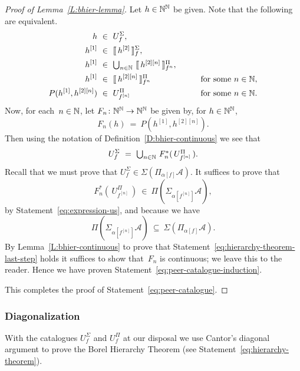 \begin{proof}[Proof of Lemma~\ref{L:bhier-lemma}]
Let $h\in\mathbb{N}^{\mathbb{N}}$ be given.
Note that the following are equivalent.
\begin{alignat*}{3}
h \ &\in\  U^\Sigma_f, \\
h^{[1]} \ &\in\ \decode{\,h^{[2]}\,}^\Sigma_f, \\
h^{[1]} \ &\in\ 
\textstyle{\bigcup_{n\in\N}}\ 
        \decode{\,h^{[2][n]}\,}^\Pi_{f^{n}}, \qquad\\
 h^{[1]} \ &\in\ 
        \decode{\,h^{[2][n]}\,}^\Pi_{f^{n}} 
\qquad&\text{for some $n\in\N$},\\
 P(h^{[1]},h^{[2][n]}) \ &\in\ 
        U^{\Pi}_{f^{[n]}} 
\qquad&\text{for some $n\in\N$}.
\end{alignat*}
Now,
for each~$n\in\mathbb{N}$,
let $F_n\colon \mathbb{N}^{\mathbb{N}} \rightarrow\mathbb{N}^{\mathbb{N}}$
be given by, for $h\in\mathbb{N}^{\mathbb{N}}$,
\begin{equation*}
F_n(h) \ =\  P(h^{[1]},h^{[2][n]}).
\end{equation*}
Then using the notation of Definition~\ref{D:bhier-continuous}
we see that
\begin{equation}
\label{eq:expression-us}
U^\Sigma_f \ =\ 
\textstyle{\bigcup_{n\in\N}} \ F_n^*(\, U^\Pi_{f^{[n]}}\,).
\end{equation}
Recall that we must prove
that $U^\Sigma_f \in \Sigma(\Pi_{\alpha[f]}\mathcal{A})$.
It suffices to prove that
\begin{equation}
\label{eq:hierarchy-theorem-last-step}
F_n^*(\, U^\Pi_{f^{[n]}}\,) \ \in\  \Pi(\Sigma_{\alpha[f^{[n]}]}\mathcal{A}),
\end{equation}
by  Statement~\eqref{eq:expression-us},
and because we have
\begin{equation*}
\Pi(\Sigma_{\alpha[f^{[n]}]}\mathcal{A}) 
\ \subseteq \ \Sigma(\Pi_{\alpha[f]}\mathcal{A}).
\end{equation*}
By Lemma~\ref{L:bhier-continuous}
to prove
that Statement~\eqref{eq:hierarchy-theorem-last-step}
holds
it suffices to show that~$F_n$
is continuous; we leave this to the reader.
Hence we have proven Statement~\eqref{eq:peer-catalogue-induction}.

This completes the proof of Statement~\eqref{eq:peer-catalogue}.
\end{proof}

\subsubsection{Diagonalization}$\,$\\
With the catalogues $U^\Sigma_f$ and $U^\Pi_f$
at our disposal
we use Cantor's diagonal argument
to prove the Borel Hierarchy Theorem
(see Statement~\eqref{eq:hierarchy-theorem}).

